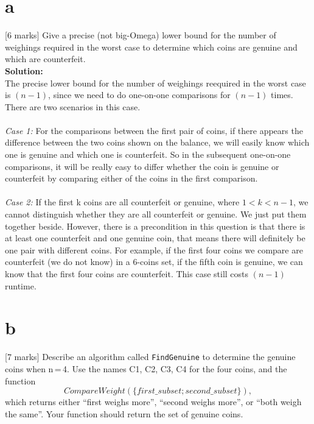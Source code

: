 \documentclass[12pt]{article}
\begin{document}
\begin{itemize}
\part{a} [6 marks] Give a precise (not big-Omega) lower bound for
the number of weighings required in the worst case to determine which
coins are genuine and which are counterfeit.
\\\textbf{Solution:}
\\The precise lower bound for the number of weighings reequired in the worst case is $(n-1)$, since we need to do one-on-one comparisons for $(n-1)$ times. There are two scenarios in this case.
\\
\\\textit{Case 1:} For the comparisons between the first pair of coins, if there appears the difference between the two coins shown on the balance, we will easily know which one is genuine and which one is counterfeit. So in the subsequent one-on-one comparisons, it will be really easy to differ whether the coin is genuine or counterfeit by comparing either of the coins in the first comparison.
\\
\\\textit{Case 2:} If the first k coins are all counterfeit or genuine, where $1 < k < n-1$, we cannot distinguish whether they are all counterfeit or genuine. We just put them together beside. However, there is a precondition in this question is that there is at least one counterfeit and one genuine coin, that means there will definitely be one pair with different coins. For example, if the first four coins we compare are counterfeit (we do not know) in a 6-coins set, if the fifth coin is genuine, we can know that the first four coins are counterfeit. This case still costs $(n-1)$ runtime.
\part{b} [7 marks] Describe an algorithm called \texttt{FindGenuine}
to determine the genuine coins when \mbox{n\,=\,4}. Use the names
C1, C2, C3, C4 for the four coins, and the function
\[ CompareWeight\left( \{ first\_subset; second\_subset\} \right), \]
which returns either ``first weighs more'', ``second weighs more'', 
or ``both weigh the same''.
Your function should return the set of genuine coins.


\end{itemize}
\end{document}
